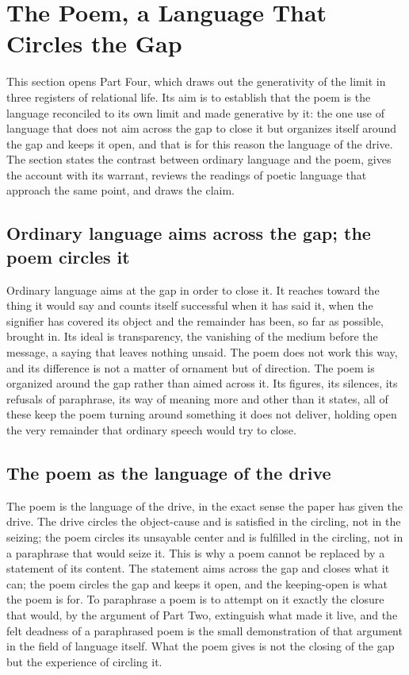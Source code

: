 \section{The Poem, a Language That Circles the Gap}
\label{p26:sec:poem}

\noindent
This section opens Part Four, which draws out the generativity of the limit in three registers of relational life. Its aim is to establish that the poem is the language reconciled to its own limit and made generative by it: the one use of language that does not aim across the gap to close it but organizes itself around the gap and keeps it open, and that is for this reason the language of the drive. The section states the contrast between ordinary language and the poem, gives the account with its warrant, reviews the readings of poetic language that approach the same point, and draws the claim.

\subsection*{Ordinary language aims across the gap; the poem circles it}

Ordinary language aims at the gap in order to close it. It reaches toward the thing it would say and counts itself successful when it has said it, when the signifier has covered its object and the remainder has been, so far as possible, brought in. Its ideal is transparency, the vanishing of the medium before the message, a saying that leaves nothing unsaid. The poem does not work this way, and its difference is not a matter of ornament but of direction. The poem is organized around the gap rather than aimed across it. Its figures, its silences, its refusals of paraphrase, its way of meaning more and other than it states, all of these keep the poem turning around something it does not deliver, holding open the very remainder that ordinary speech would try to close.

\subsection*{The poem as the language of the drive}

The poem is the language of the drive, in the exact sense the paper has given the drive. The drive circles the object-cause and is satisfied in the circling, not in the seizing; the poem circles its unsayable center and is fulfilled in the circling, not in a paraphrase that would seize it. This is why a poem cannot be replaced by a statement of its content. The statement aims across the gap and closes what it can; the poem circles the gap and keeps it open, and the keeping-open is what the poem is for. To paraphrase a poem is to attempt on it exactly the closure that would, by the argument of Part Two, extinguish what made it live, and the felt deadness of a paraphrased poem is the small demonstration of that argument in the field of language itself. What the poem gives is not the closing of the gap but the experience of circling it.

